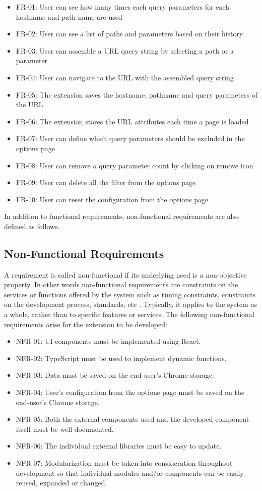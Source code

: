 \begin{itemize}
  \item FR-01: User can see how many times each query parameters for each hostname and path name are used
  \item FR-02: User can see a list of paths and parameters based on their history
  \item FR-03: User can assemble a URL query string by selecting a path or a parameter
  \item FR-04: User can navigate to the URL with the assembled query string
  \item FR-05: The extension saves the hostname, pathname and query parameters of the URL
  \item FR-06: The extension stores the URL attributes each time a page is loaded
  \item FR-07: User can define which query parameters should be excluded in the options page
  \item FR-08: User can remove a query parameter count by clicking on remove icon
  \item FR-09: User can delete all the filter from the options page
  \item FR-10: User can reset the configuration from the options page
\end{itemize}

In addition to functional requirements, non-functional requirements are also defined as follows.

\subsection{Non-Functional Requirements}
A requirement is called non-functional if its underlying need is a non-objective property. In other words non-functional requirements are constraints on the services or functions offered by the system such as timing constraints, constraints on the development process, standards, etc \autocite{sommerville2011software}. Typically, it applies to the system as a whole, rather than to specific features or services. The following non-functional requirements arise for the extension to be developed:

\begin{itemize}
  \item NFR-01: UI components must be implemented using React.
  \item NFR-02: TypeScript must be used to implement dynamic functions.
  \item NFR-03: Data must be saved on the end-user's Chrome storage.
  \item NFR-04: User's configuration from the options page must be saved on the end-user's Chrome storage.
  \item NFR-05: Both the external components used and the developed component itself must be well documented.
  \item NFR-06: The individual external libraries must be easy to update.
  \item NFR-07: Modularization must be taken into consideration throughout development so that individual modules and/or components can be easily reused, expanded or changed.
\end{itemize}

